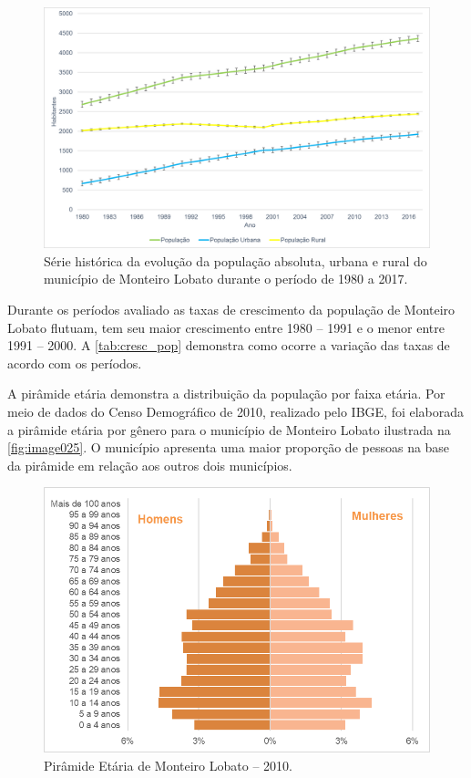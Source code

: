  \begin{figure}[h!]
	\centering
	\includegraphics[width=0.85\linewidth]{produtos/proddois/image024}
	\caption{Série histórica da evolução da população absoluta, urbana e rural do município de Monteiro Lobato durante o período de 1980 a 2017.}
	\label{fig:image024}
\end{figure}

Durante os períodos avaliado as taxas de crescimento da população de Monteiro Lobato flutuam, tem seu maior crescimento entre 1980 – 1991 e o menor entre 1991 – 2000. A \autoref{tab:cresc_pop} demonstra como ocorre a variação das taxas de acordo com os períodos.



A pirâmide etária demonstra a distribuição da população por faixa etária. Por meio de dados do Censo Demográfico de 2010, realizado pelo IBGE, foi elaborada a pirâmide etária por gênero para o município de Monteiro Lobato ilustrada na \autoref{fig:image025}. O município apresenta uma maior proporção de pessoas na base da pirâmide em relação aos outros dois municípios.


\begin{figure}[h!]
 	\centering
 	\includegraphics[width=0.85\linewidth]{produtos/proddois/image025}
 	\caption{Pirâmide Etária de Monteiro Lobato – 2010.}
 	\label{fig:image025}
 \end{figure}

